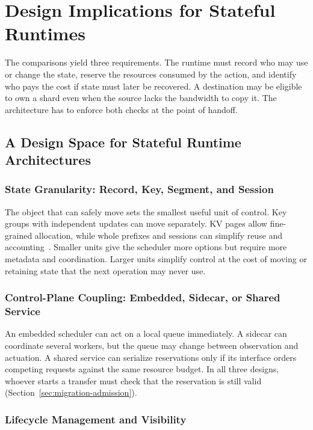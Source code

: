 \documentclass[manuscript]{acmart}
\begin{document}
\section{Design Implications for Stateful Runtimes}
\label{sec:design-implications}
The comparisons yield three requirements. The runtime must record who may use or change the state, reserve the resources consumed by the action, and identify who pays the cost if state must later be recovered. A destination may be eligible to own a shard even when the source lacks the bandwidth to copy it. The architecture has to enforce both checks at the point of handoff.

\subsection{A Design Space for Stateful Runtime Architectures}

\subsubsection{State Granularity: Record, Key, Segment, and Session}

The object that can safely move sets the smallest useful unit of control. Key groups with independent updates can move separately. KV pages allow fine-grained allocation, while whole prefixes and sessions can simplify reuse and accounting~\cite{zhang2019briskstream,kwon2023pagedattention,zheng2023sglang}. Smaller units give the scheduler more options but require more metadata and coordination. Larger units simplify control at the cost of moving or retaining state that the next operation may never use.

\subsubsection{Control-Plane Coupling: Embedded, Sidecar, or Shared Service}

An embedded scheduler can act on a local queue immediately. A sidecar can coordinate several workers, but the queue may change between observation and actuation. A shared service can serialize reservations only if its interface orders competing requests against the same resource budget. In all three designs, whoever starts a transfer must check that the reservation is still valid (Section~\ref{sec:migration-admission}).

\subsubsection{Lifecycle Management and Visibility}
\end{document}
